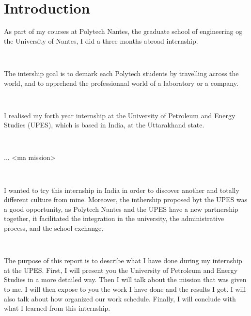 \chapter{Introduction}

As part of my courses at Polytech Nantes, the graduate school of engineering og the University of Nantes, I did a three months abroad internship. 

~~

The intership goal is to demark each Polytech students by travelling across the world, and to apprehend the professionnal world of a laboratory or a company.

~~

I realised my forth year internship at the University of Petroleum and Energy Studies (UPES), which is based in India, at the Uttarakhand state.

~~

... <ma mission>

~~

I wanted to try this internship in India in order to discover another and totally different culture from mine. Moreover, the inthership proposed byt the UPES was a good opportunity, as Polytech Nantes and the UPES have a new partnership together, it facilitated the integration in the university, the administrative process, and the school exchange. 

~~

The purpose of this report is to describe what I have done during my internship at the UPES. First, I will present you the University of Petroleum and Energy Studies in a more detailed way. Then I will talk about the mission that was given to me. I will then expose to you the work I have done and the results I got. I will also talk about how organized our work schedule. Finally, I will conclude with what I learned from this internship.
